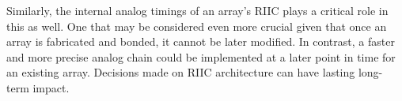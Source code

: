     Similarly, the internal analog timings of an array's RIIC plays a critical role in this as well. One that may be considered even more crucial given that once an array is fabricated and bonded, it cannot be later modified. In contrast, a faster and more precise analog chain could be implemented at a later point in time for an existing array. Decisions made on RIIC architecture can have lasting long-term impact.
